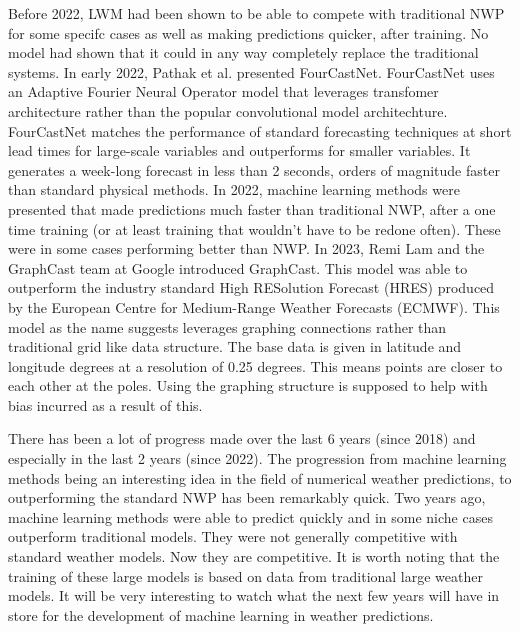 Before 2022, LWM had been shown to be able to compete with traditional NWP for some specifc cases as well as making predictions quicker, after training. No model had shown that it could in any way completely replace the traditional systems. In early 2022, Pathak et al.\cite{FourCastNet} presented FourCastNet. FourCastNet uses an Adaptive Fourier Neural Operator model that leverages transfomer architecture rather than the popular convolutional model architechture. FourCastNet matches the performance of standard forecasting techniques at short lead times for large-scale variables and outperforms for smaller variables. It generates a week-long forecast in less than 2 seconds, orders of magnitude faster than standard physical methods\cite{FourCastNet}. In 2022, machine learning methods were presented that made predictions much faster than traditional NWP, after a one time training (or at least training that wouldn't have to be redone often). These were in some cases performing better than NWP. In 2023, Remi Lam and the GraphCast team at Google introduced GraphCast. This model was able to outperform the industry standard High RESolution Forecast (HRES) produced by the European Centre for Medium-Range Weather Forecasts (ECMWF). This model as the name suggests leverages graphing connections rather than traditional grid like data structure. The base data is given in latitude and longitude degrees at a resolution of 0.25 degrees. This means points are closer to each other at the poles. Using the graphing structure is supposed to help with bias incurred as a result of this\cite{GraphCast}.

There has been a lot of progress made over the last 6 years (since 2018) and especially in the last 2 years (since 2022)\cite{SecondRevolution}. The progression from machine learning methods being an interesting idea in the field of numerical weather predictions, to outperforming the standard NWP has been remarkably quick. Two years ago, machine learning methods were able to predict quickly and in some niche cases outperform traditional models. They were not generally competitive with standard weather models. Now they are competitive. It is worth noting that the training of these large models is based on data from traditional large weather models. It will be very interesting to watch what the next few years will have in store for the development of machine learning in weather predictions.


